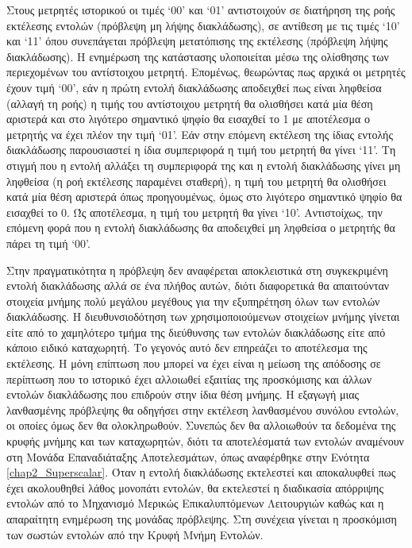 Στους μετρητές ιστορικού οι τιμές ‘00’ και ‘01’ αντιστοιχούν σε διατήρηση της ροής εκτέλεσης εντολών (πρόβλεψη μη λήψης διακλάδωσης), σε αντίθεση με τις τιμές ‘10’ και ‘11’ όπου συνεπάγεται πρόβλεψη μετατόπισης της εκτέλεσης (πρόβλεψη λήψης διακλάδωσης). Η ενημέρωση της κατάστασης υλοποιείται μέσω της ολίσθησης των περιεχομένων του αντίστοιχου μετρητή. Επομένως, θεωρώντας πως αρχικά οι μετρητές έχουν τιμή ‘00’, εάν η πρώτη εντολή διακλάδωσης αποδειχθεί πως είναι ληφθείσα (αλλαγή τη ροής) η τιμής του αντίστοιχου μετρητή θα ολισθήσει κατά μία θέση αριστερά και στο λιγότερο σημαντικό ψηφίο θα εισαχθεί το 1 με αποτέλεσμα ο μετρητής να έχει πλέον την τιμή ‘01’. Εάν στην επόμενη εκτέλεση της ίδιας εντολής διακλάδωσης παρουσιαστεί η ίδια συμπεριφορά η τιμή του μετρητή θα γίνει ‘11’. Τη στιγμή που η εντολή αλλάξει τη συμπεριφορά της και η εντολή διακλάδωσης γίνει μη ληφθείσα (η ροή εκτέλεσης παραμένει σταθερή), η τιμή του μετρητή θα ολισθήσει κατά μία θέση αριστερά όπως προηγουμένως, όμως στο λιγότερο σημαντικό ψηφίο θα εισαχθεί το 0. Ώς αποτέλεσμα, η τιμή του μετρητή θα γίνει ‘10’. Αντιστοίχως, την επόμενη φορά που η εντολή διακλάδωσης θα αποδειχθεί μη ληφθείσα ο μετρητής θα πάρει τη τιμή ‘00’.
\par
Στην πραγματικότητα η πρόβλεψη δεν αναφέρεται αποκλειστικά στη συγκεκριμένη εντολή διακλάδωσης αλλά σε ένα πλήθος αυτών, διότι διαφορετικά θα απαιτούνταν στοιχεία μνήμης πολύ μεγάλου μεγέθους για την εξυπηρέτηση όλων των εντολών διακλάδωσης. Η διευθυνσιοδότηση των χρησιμοποιούμενων στοιχείων μνήμης γίνεται είτε από το χαμηλότερο τμήμα της διεύθυνσης των εντολών διακλάδωσης είτε από κάποιο ειδικό καταχωρητή. Το γεγονός αυτό δεν επηρεάζει το αποτέλεσμα της εκτέλεσης. Η μόνη επίπτωση που μπορεί να έχει είναι η μείωση της απόδοσης σε περίπτωση που το ιστορικό έχει αλλοιωθεί εξαιτίας της προσκόμισης και άλλων εντολών διακλάδωσης που επιδρούν στην ίδια θέση μνήμης. Η εξαγωγή μιας λανθασμένης πρόβλεψης θα οδηγήσει στην εκτέλεση λανθασμένου συνόλου εντολών, οι οποίες όμως δεν θα ολοκληρωθούν. Συνεπώς δεν θα αλλοιωθούν τα δεδομένα της κρυφής μνήμης και των καταχωρητών, διότι τα αποτελέσματά των εντολών αναμένουν στη Μονάδα Επαναδιάταξης Αποτελεσμάτων, όπως αναφέρθηκε στην Ενότητα \ref{chap2_Superscalar}. Όταν η εντολή διακλάδωσης εκτελεστεί και αποκαλυφθεί πως έχει ακολουθηθεί λάθος μονοπάτι εντολών, θα εκτελεστεί η διαδικασία απόρριψης εντολών από το Μηχανισμό Μερικώς Επικαλυπτόμενων Λειτουργιών καθώς και η απαραίτητη ενημέρωση της μονάδας πρόβλεψης. Στη συνέχεια γίνεται η προσκόμιση των σωστών εντολών από την Κρυφή Μνήμη Εντολών.

